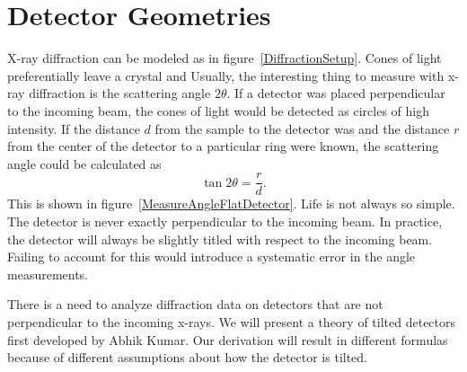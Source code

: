 \chapter{Detector Geometries}\label{theory_chapter}

X-ray diffraction can be modeled as in figure~\ref{DiffractionSetup}. 
Cones of light preferentially leave a crystal and Usually, the 
interesting thing to measure with x-ray 
diffraction is the scattering angle 
$2\theta$. If a detector was placed perpendicular 
to the incoming beam, the cones of light would be detected as 
circles of high intensity. 
If the distance $d$ 
from the sample to the detector was and 
the distance $r$ from the center of the detector to a 
particular ring were known, the scattering angle could
be calculated as
\begin{equation}
    \tan2\theta = \frac{r}{d}.
\end{equation}
This is shown in figure~\ref{MeasureAngleFlatDetector}. 
Life is not always so simple. The detector is never
exactly perpendicular to the incoming beam.  In practice, 
the detector will always be slightly titled with respect 
to the incoming beam. Failing to account for this would
introduce a systematic error in the angle measurements.

\begin{SCfigure}[1][bthp]
    \centering
    
    \caption{An X-Ray diffraction setup. X-rays scatter from a 
    sample and are captured by a detector.}
    \label{DiffractionSetup}
\end{SCfigure}

\begin{SCfigure}[1][bthp]
    \centering
    
    \caption{The same setup as in figure~\ref{DiffractionSetup}. 
    $2\theta$ is the scattering angle of the light,
    $d$ is the distance 
    from the crystal to the detector, and $r$ is the distance 
    from the center of the detector.}
    \label{MeasureAngleFlatDetector}
\end{SCfigure}

There is a need to analyze diffraction data on detectors that are 
not perpendicular to the incoming x-rays. We will present a 
theory of tilted detectors first developed by Abhik Kumar\cite{Kumar05}.
 Our derivation will result in 
different formulas because of different assumptions
about how the detector is tilted. 

